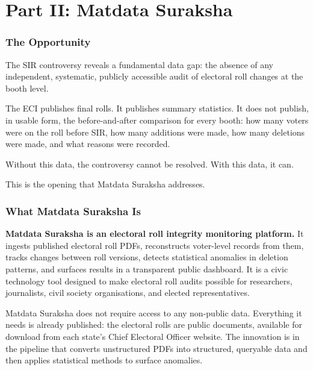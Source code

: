 \documentclass[11pt, a4paper]{article}
\begin{document}
\newpage

\part*{Part II: Matdata Suraksha}

\section{The Opportunity}

The SIR controversy reveals a fundamental data gap: the absence of any independent, systematic, publicly accessible audit of electoral roll changes at the booth level.

The ECI publishes final rolls. It publishes summary statistics. It does not publish, in usable form, the before-and-after comparison for every booth: how many voters were on the roll before SIR, how many additions were made, how many deletions were made, and what reasons were recorded.

Without this data, the controversy cannot be resolved. With this data, it can.

This is the opening that Matdata Suraksha addresses.

\section{What Matdata Suraksha Is}

\begin{tcolorbox}[colback=pollityblue!8, colframe=pollityblue, sharp corners, boxrule=0.6pt]
\textbf{Matdata Suraksha is an electoral roll integrity monitoring platform.} It ingests published electoral roll PDFs, reconstructs voter-level records from them, tracks changes between roll versions, detects statistical anomalies in deletion patterns, and surfaces results in a transparent public dashboard. It is a civic technology tool designed to make electoral roll audits possible for researchers, journalists, civil society organisations, and elected representatives.
\end{tcolorbox}

\vspace{0.8em}

Matdata Suraksha does not require access to any non-public data. Everything it needs is already published: the electoral rolls are public documents, available for download from each state's Chief Electoral Officer website. The innovation is in the pipeline that converts unstructured PDFs into structured, queryable data and then applies statistical methods to surface anomalies.
\end{document}
